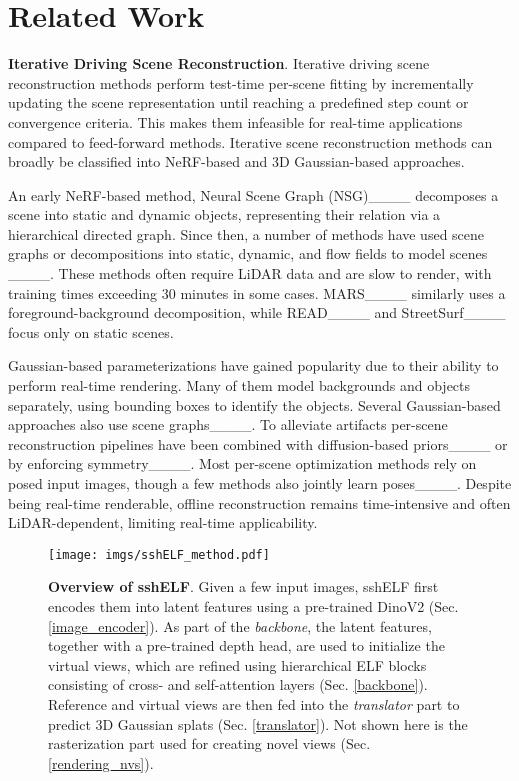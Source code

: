 \section{Related Work}
\label{sec:background}

\textbf{Iterative Driving Scene Reconstruction}. Iterative driving scene reconstruction methods perform test-time per-scene fitting by incrementally updating the scene representation until reaching a predefined step count or convergence criteria. This makes them infeasible for real-time applications compared to feed-forward methods. Iterative scene reconstruction methods can broadly be classified into NeRF-based and 3D Gaussian-based approaches. 

An early NeRF-based method, Neural Scene Graph (NSG)____ decomposes a scene into static and dynamic objects, representing their relation via a hierarchical directed graph. Since then, a number of methods have used scene graphs or decompositions into static, dynamic, and flow fields to model scenes ____. These methods often require LiDAR data and are slow to render, with training times exceeding 30 minutes in some cases. MARS____ similarly uses a foreground-background decomposition, while READ____ and StreetSurf____ focus only on static scenes.

Gaussian-based parameterizations have gained popularity due to their ability to perform real-time rendering. Many of them model backgrounds and objects separately, using bounding boxes to identify the objects. Several Gaussian-based approaches also use scene graphs____. To alleviate artifacts per-scene reconstruction pipelines have been combined with diffusion-based priors____ or by enforcing symmetry____. Most per-scene optimization methods rely on posed input images, though a few methods also jointly learn poses____. Despite being real-time renderable, offline reconstruction remains time-intensive and often LiDAR-dependent, limiting real-time applicability. \\

\begin{figure*}[t!]
    \centering
    \texttt{[image: imgs/sshELF\_method.pdf]}
    \caption{\textbf{Overview of sshELF}. Given a few input images, sshELF first encodes them into latent features using a pre-trained DinoV2 (Sec.\ref{image_encoder}). As part of the \textit{backbone}, the latent features, together with a pre-trained depth head, are used to initialize the virtual views, which are refined using hierarchical ELF blocks consisting of cross- and self-attention layers (Sec. \ref{backbone}). Reference and virtual views are then fed into the \textit{translator} part to predict 3D Gaussian splats (Sec. \ref{translator}). Not shown here is the rasterization part used for creating novel views (Sec. \ref{rendering_nvs}).}
    \label{fig:sshELF_model}
\end{figure*}

